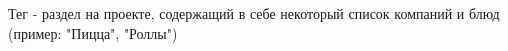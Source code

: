 Тег - раздел на проекте, содержащий в себе некоторый список компаний и блюд
(пример: "Пицца", "Роллы")
